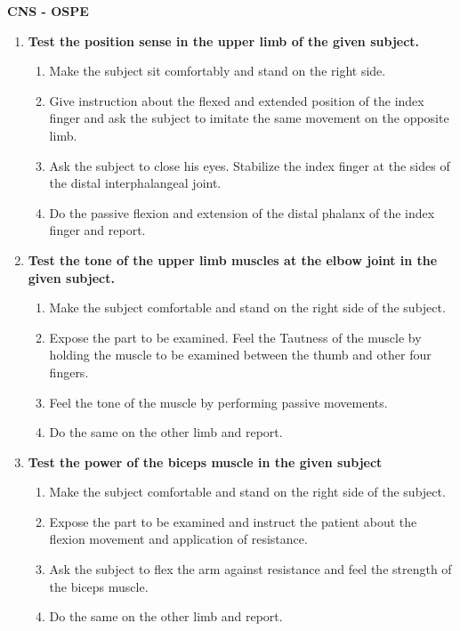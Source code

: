 \documentclass[a4paper,10pt]{article}
\begin{document}
\vspace*{\fill}
	\begin{center}
		\begin{Huge}
				\textbf {CNS - OSPE}
		\end{Huge}	
	\end{center}

	\begin{enumerate}[I]
		\item \textbf{Test the position sense in the upper limb of the given subject.}
		\begin{enumerate}[1]
			\item Make the subject sit comfortably and stand on the right side.
			\item Give instruction about the flexed and extended position of the index finger and ask the subject to imitate the same movement on the opposite limb.
			\item Ask the subject to close his eyes. Stabilize the index finger at the sides of the distal interphalangeal joint.
			\item Do the passive flexion and extension of the distal phalanx of the index finger and report.
		\end{enumerate}
		
		\item \textbf{Test the tone of the upper limb muscles at the elbow joint in the given subject.}


		\begin{enumerate}[1]
			\item Make the subject comfortable and stand on the right side of the subject.
			\item Expose the part to be examined. Feel the Tautness of the muscle by holding the muscle to be examined between the thumb and other four fingers.
			\item Feel the tone of the muscle by performing passive movements.
			\item Do the same on the other limb and report.
		\end{enumerate}				
		
		\item \textbf{Test the power of the biceps muscle in the given subject}
		\begin{enumerate}[1]
		\item Make the subject comfortable and stand on the right side of the subject.
		\item Expose the part to be examined and instruct the patient about the flexion movement and application of resistance.
		\item Ask the subject to flex the arm against resistance and feel the strength of the biceps muscle.
		\item Do the same on the other limb and report.
		\end{enumerate}
		

\end{enumerate}
\end{document}
